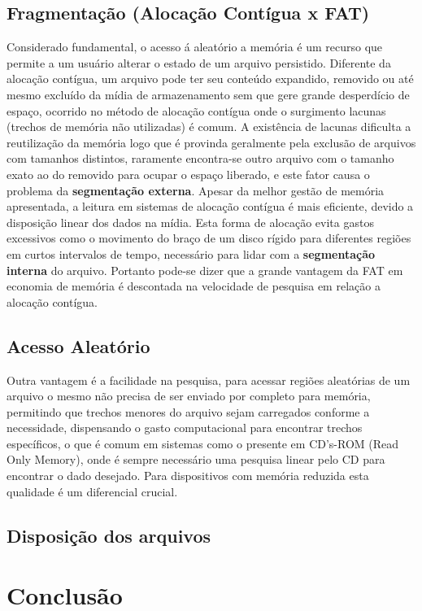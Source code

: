 \documentclass{article}
\begin{document}
\subsection{Fragmentação (Alocação Contígua x FAT)} 
	Considerado fundamental, o acesso á aleatório a memória é um recurso que permite a um usuário alterar o estado de um arquivo persistido. Diferente da alocação contígua, um arquivo pode ter seu conteúdo expandido, removido ou até mesmo excluído da mídia de armazenamento sem que gere grande desperdício de espaço, ocorrido no método de alocação contígua onde o surgimento lacunas (trechos de memória não utilizadas) é comum. A existência de lacunas dificulta a reutilização da memória logo que é provinda geralmente pela exclusão de arquivos com tamanhos distintos, raramente encontra-se outro arquivo com o tamanho exato ao do removido para ocupar o espaço liberado, e este fator causa o problema da \textbf{segmentação externa}. 
	Apesar da melhor gestão de memória apresentada, a leitura em sistemas de alocação contígua é mais eficiente, devido a disposição linear dos dados na mídia. Esta forma de alocação evita gastos excessivos como o movimento do braço de um disco rígido para diferentes regiões em curtos intervalos de tempo, necessário para lidar com a \textbf{segmentação interna} do arquivo. Portanto pode-se dizer que a grande vantagem da FAT em economia de memória é descontada na velocidade de pesquisa em relação a alocação contígua. 

\subsection{Acesso Aleatório} 
	Outra vantagem é a facilidade na pesquisa, para acessar regiões aleatórias de um arquivo o mesmo não precisa de ser enviado por completo para memória, permitindo que trechos menores do arquivo sejam carregados conforme a necessidade, dispensando o gasto computacional para encontrar trechos específicos, o que é comum em sistemas como o presente em CD's-ROM (Read Only Memory), onde é sempre necessário uma pesquisa linear pelo CD para encontrar o dado desejado. Para dispositivos com memória reduzida esta qualidade é um diferencial crucial. 

\subsection{Disposição dos arquivos}
    
\section{Conclusão}
    
\end{document}
